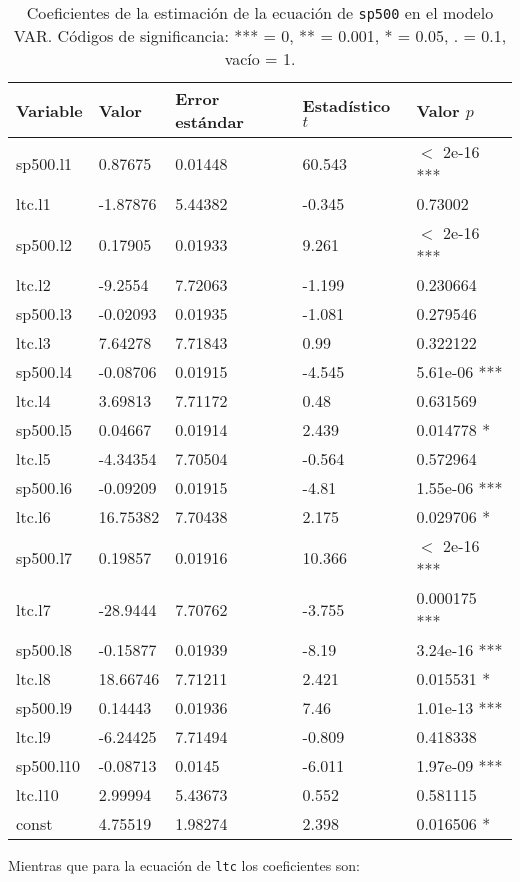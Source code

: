 \documentclass{article}
\begin{document}
\begin{table}[H]
\centering
\begin{tabularx}{0.9\textwidth}{XXXXX}
\toprule
Variable & Valor & Error estándar & Estadístico $t$ & Valor $p$ \\
\midrule
sp500.l1&0.87675&0.01448&60.543& $<$ 2e-16 ***\\
ltc.l1&-1.87876&5.44382&-0.345&0.73002\\
sp500.l2&0.17905&0.01933&9.261& $<$ 2e-16 ***\\
ltc.l2&-9.2554&7.72063&-1.199&0.230664\\
sp500.l3&-0.02093&0.01935&-1.081&0.279546\\
ltc.l3&7.64278&7.71843&0.99&0.322122\\
sp500.l4&-0.08706&0.01915&-4.545&5.61e-06 ***\\
ltc.l4&3.69813&7.71172&0.48&0.631569\\
sp500.l5&0.04667&0.01914&2.439&0.014778 *\\
ltc.l5&-4.34354&7.70504&-0.564&0.572964\\
sp500.l6&-0.09209&0.01915&-4.81&1.55e-06 ***\\
ltc.l6&16.75382&7.70438&2.175&0.029706 *\\
sp500.l7&0.19857&0.01916&10.366& $<$ 2e-16 ***\\
ltc.l7&-28.9444&7.70762&-3.755&0.000175 ***\\
sp500.l8&-0.15877&0.01939&-8.19&3.24e-16 ***\\
ltc.l8&18.66746&7.71211&2.421&0.015531 *\\
sp500.l9&0.14443&0.01936&7.46&1.01e-13 ***\\
ltc.l9&-6.24425&7.71494&-0.809&0.418338\\
sp500.l10&-0.08713&0.0145&-6.011&1.97e-09 ***\\
ltc.l10&2.99994&5.43673&0.552&0.581115\\
const&4.75519&1.98274&2.398&0.016506 *\\
\bottomrule
\end{tabularx}
\caption{\label{tab:var-sp500}Coeficientes de la estimación de la ecuación de \texttt{sp500} en el modelo VAR. Códigos de significancia: *** = 0, ** = 0.001, * = 0.05, . = 0.1, vacío = 1.}
\end{table}

Mientras que para la ecuación de \texttt{ltc} los coeficientes son:
\end{document}
